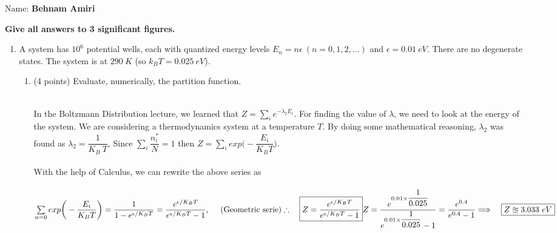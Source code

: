 \documentclass[fleqn]{article}
\begin{document}
  Name: \textbf{Behnam Amiri}

  \vspace{1cm}

  \textbf{Give all answers to 3 significant figures.}

  \begin{enumerate}
    \item A system has $10^6$ potential wells, each with quantized energy levels $E_n=n \epsilon ~ (n=0,1,2,...)$
    and $\epsilon=0.01 ~ eV$. There are no degenerate states. The system is at $290 ~ K$ (so $k_B T=0.025 ~ eV$).
      \begin{enumerate}
        \item (4 points) Evaluate, numerically, the partition function.

          \textcolor{hwColor}{
            \\
            In the Boltzmann Distribution lecture, we learned that $Z=\sum\limits_{i} e^{-\lambda_2 E_i}$. For 
            finding the value of $\lambda$, we need to look at the energy of the system. We are considering a 
            thermodynamics system at a temperature $T$. By doing some mathematical reasoning, $\lambda_2$ was 
            found as $\lambda_2=\dfrac{1}{K_B ~ T}$.
            Since $\sum\limits_{i} \dfrac{n^*_i}{N}=1$ then $Z=\sum\limits_{i} exp\bigg( -\dfrac{E_i}{K_B T} \bigg)$.
            \\
            \\
            With the help of Calculus, we can rewrite the above series as
            \\
            \\
            $
              \sum\limits_{n=0} exp\bigg( -\dfrac{E_i}{K_B T} \bigg)=\dfrac{1}{1-e^{\epsilon/K_B T}}
              =\dfrac{e^{\epsilon/K_B T}}{e^{\epsilon/K_B T}-1}, ~~~~ (\text{Geometric serie})
              \\
              \\
              \\
              \therefore ~~~ \boxed{Z=\dfrac{e^{\epsilon/K_B T}}{e^{\epsilon/K_B T}-1}}
              \\
              \\
              \\
              Z=\dfrac{
                e^{0.01 \times \dfrac{1}{0.025}}
              }{
                e^{0.01 \times \dfrac{1}{0.025}}-1
              }
              =\dfrac{
                e^{0.4}
              }{
                e^{0.4}-1
              }
              \Longrightarrow
              ~~~ \boxed{
                Z \approxeq 3.033 ~ eV
              }
              \\
              \\
            $
          }


\end{enumerate}
\end{enumerate}
\end{document}
